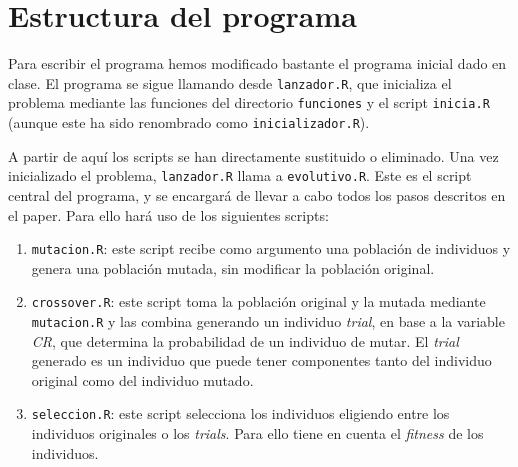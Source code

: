 \documentclass{article}
\begin{document}
\section{Estructura del programa}
Para escribir el programa hemos modificado bastante el programa inicial dado en clase. El programa se sigue llamando desde \texttt{lanzador.R}, que inicializa el problema mediante las funciones del directorio \texttt{funciones} y el script \texttt{inicia.R} (aunque este ha sido renombrado como \texttt{inicializador.R}).

A partir de aquí los scripts se han directamente sustituido o eliminado. Una vez inicializado el problema, \texttt{lanzador.R} llama a \texttt{evolutivo.R}. Este es el script central del programa, y se encargará de llevar a cabo todos los pasos descritos en el paper\cite{mainPaper}. Para ello hará uso de los siguientes scripts:
\begin{enumerate}
    \item \texttt{mutacion.R}: este script recibe como argumento una población de individuos y genera una población mutada, sin modificar la población original.
    \item \texttt{crossover.R}: este script toma la población original y la mutada mediante \texttt{mutacion.R} y las combina generando un individuo \textit{trial}, en base a la variable \textit{CR}, que determina la probabilidad de un individuo de mutar. El \textit{trial} generado es un individuo que puede tener componentes tanto del individuo original como del individuo mutado.
    \item \texttt{seleccion.R}: este script selecciona los individuos eligiendo entre los individuos originales o los \textit{trials}. Para ello tiene en cuenta el \textit{fitness} de los individuos.
    \end{enumerate}
{}

\end{document}
